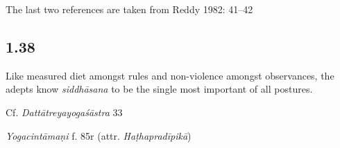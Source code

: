 \begin{ekdosis}
\begin{testimonia}[hp01_037]
The last two references are taken from Reddy 1982: 41–42

\end{testimonia}

\subsection*{1.38}
\begin{translation}[hp01_038]
Like measured diet amongst rules and non-violence amongst observances, the adepts know \emph{siddhāsana} to be the single most important of all postures.
\end{translation}

\begin{sources}[hp01_038]
Cf. \emph{Dattātreyayogaśāstra} 33

\begin{versinnote}
\end{versinnote}

\end{sources}

\begin{testimonia}[hp01_038]
\emph{Yogacintāmaṇi} f. 85r (attr. \emph{Haṭhapradīpikā})

\begin{versinnote}
\end{versinnote}

\end{testimonia}

\begin{philcomm}[hp01_038]


\end{philcomm}
\end{ekdosis}
